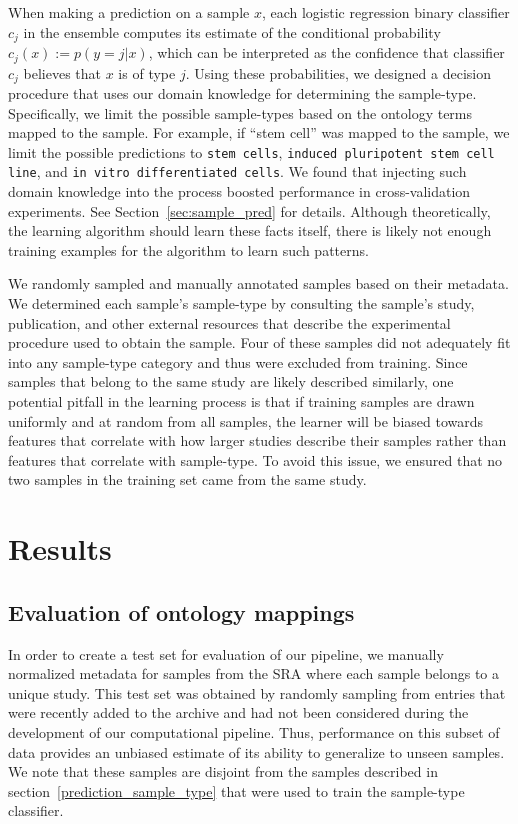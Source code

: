 When making a prediction on a sample $x$, each logistic regression binary classifier $c_j$ in the ensemble computes its estimate of the conditional probability $c_j(x) := p(y = j | x)$, which can be interpreted as the confidence that classifier $c_j$ believes that $x$ is of type $j$.  Using these probabilities, we designed a decision procedure that uses our domain knowledge for determining the sample-type.  Specifically, we limit the possible sample-types based on the ontology terms mapped to the sample. For example, if ``stem cell'' was mapped to the sample, we limit the possible predictions to \texttt{stem cells}, \texttt{induced pluripotent stem cell line}, and \texttt{in vitro differentiated cells}.  We found that injecting such domain knowledge into the process boosted performance in cross-validation experiments. See Section~\ref{sec:sample_pred} for details.  Although theoretically, the learning algorithm should learn these facts itself, there is likely not enough training examples for the algorithm to learn such patterns.

We randomly sampled and manually annotated \SampleTypeTrainingSetSize{} samples based on their metadata. We determined each sample's sample-type by consulting the sample's study, publication, and other external resources that describe the experimental procedure used to obtain the sample.  Four of these samples did not adequately fit into any sample-type category and thus were excluded from training. Since samples that belong to the same study are likely described similarly, one potential pitfall in the learning process is that if training samples are drawn uniformly and at random from all samples, the learner will be biased towards features that correlate with how larger studies describe their samples rather than features that correlate with sample-type.  To avoid this issue, we ensured that no two samples in the training set came from the same study. 




\section{Results}

\subsection{Evaluation of ontology mappings}\label{sec:eval_onto_mappings}

In order to create a test set for evaluation of our pipeline, we manually normalized metadata for \TestSetSize{} samples from the SRA where each sample belongs to a unique study. This test set was obtained by randomly sampling from entries that were recently added to the archive and had not been considered during the development of our computational pipeline. Thus, performance on this subset of data provides an unbiased estimate of its ability to generalize to unseen samples.  We note that these \TestSetSize{} samples are disjoint from the \SampleTypeTrainingSetSize{} samples described in section~\ref{prediction_sample_type} that were used to train the sample-type classifier. 

